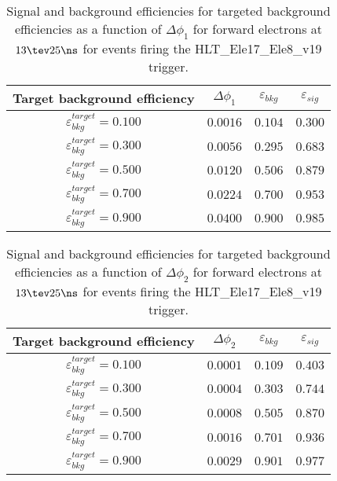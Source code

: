 \clearpage

\begin{table}[!bht]
  \begin{center}
    \begin{tabular}{cccc}
      \hline
      Target background efficiency & $\Delta\phi_1$ & $\varepsilon_{bkg}$ & $\varepsilon_{sig}$ \\ 
      \hline
      $\varepsilon_{bkg}^{target} = 0.100$ & $  0.0016$ & $0.104$ & $0.300$ \\
      $\varepsilon_{bkg}^{target} = 0.300$ & $  0.0056$ & $0.295$ & $0.683$ \\
      $\varepsilon_{bkg}^{target} = 0.500$ & $  0.0120$ & $0.506$ & $0.879$ \\
      $\varepsilon_{bkg}^{target} = 0.700$ & $  0.0224$ & $0.700$ & $0.953$ \\
      $\varepsilon_{bkg}^{target} = 0.900$ & $  0.0400$ & $0.900$ & $0.985$ \\
      \hline
    \end{tabular}
    \caption{Signal and background efficiencies for targeted background efficiencies as a function of $\Delta\phi_1$ for forward electrons at $13\tev 25\ns$ for events firing the HLT\_Ele17\_Ele8\_v19 trigger.}
    \label{tab:eff_rej_phi1_beam_13_25_trigger_17_8_F}
  \end{center}
\end{table}

\clearpage

\begin{table}[!bht]
  \begin{center}
    \begin{tabular}{cccc}
      \hline
      Target background efficiency & $\Delta\phi_2$ & $\varepsilon_{bkg}$ & $\varepsilon_{sig}$ \\ 
      \hline
      $\varepsilon_{bkg}^{target} = 0.100$ & $  0.0001$ & $0.109$ & $0.403$ \\
      $\varepsilon_{bkg}^{target} = 0.300$ & $  0.0004$ & $0.303$ & $0.744$ \\
      $\varepsilon_{bkg}^{target} = 0.500$ & $  0.0008$ & $0.505$ & $0.870$ \\
      $\varepsilon_{bkg}^{target} = 0.700$ & $  0.0016$ & $0.701$ & $0.936$ \\
      $\varepsilon_{bkg}^{target} = 0.900$ & $  0.0029$ & $0.901$ & $0.977$ \\
      \hline
    \end{tabular}
    \caption{Signal and background efficiencies for targeted background efficiencies as a function of $\Delta\phi_2$ for forward electrons at $13\tev 25\ns$ for events firing the HLT\_Ele17\_Ele8\_v19 trigger.}
    \label{tab:eff_rej_phi2_beam_13_25_trigger_17_8_F}
  \end{center}
\end{table}

